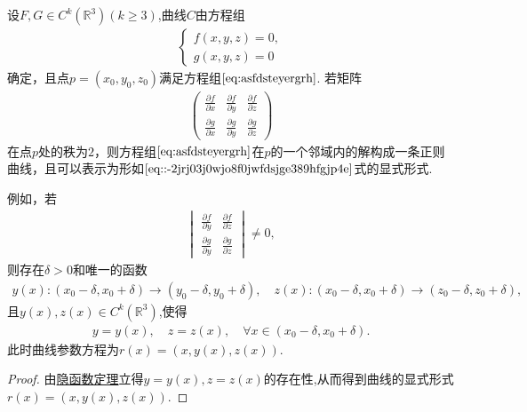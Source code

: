 \documentclass[../../main.tex]{subfiles}%
\begin{document}
\begin{theorem}[正则参数曲线的隐式形式]
设$F,G\in C^k(\mathbb{R}^3)(k\geqslant 3)$,曲线$C$由方程组
\begin{gather}\label{eq:asfdsteyergrh}
\begin{cases}
f(x,y,z)=0,\\
g(x,y,z)=0
\end{cases}
\end{gather}
确定，且点$p=(x_0,y_0,z_0)$满足方程组$\eqref{eq:asfdsteyergrh}$. 若矩阵
\begin{align*}
\begin{pmatrix}
\frac{\partial f}{\partial x} & \frac{\partial f}{\partial y} & \frac{\partial f}{\partial z}\\[2mm]
\frac{\partial g}{\partial x} & \frac{\partial g}{\partial y} & \frac{\partial g}{\partial z}
\end{pmatrix}
\end{align*}
在点$p$处的秩为$2$，则方程组$\eqref{eq:asfdsteyergrh}$在$p$的一个邻域内的解构成一条正则曲线，且可以表示为形如$\eqref{eq::-2jrj03j0wjo8f0jwfdsjge389hfgjp4e}$式的显式形式.

例如，若
\begin{align*}
\begin{vmatrix}
\frac{\partial f}{\partial y} & \frac{\partial f}{\partial z}\\[2mm]
\frac{\partial g}{\partial y} & \frac{\partial g}{\partial z}
\end{vmatrix}\neq 0,
\end{align*}
则存在$\delta>0$和唯一的函数
\begin{align*}
y(x):(x_0-\delta ,x_0+\delta )\rightarrow (y_0-\delta ,y_0+\delta ),
\quad z(x):(x_0-\delta ,x_0+\delta )\rightarrow (z_0-\delta ,z_0+\delta ),
\end{align*}
且$y(x),z(x)\in C^k(\mathbb{R}^3)$,使得
\begin{align*}
y=y(x),\quad z=z(x),\quad \forall x\in (x_0-\delta,x_0+\delta).
\end{align*}
此时曲线参数方程为$r(x)=(x,y(x),z(x))$. 
\end{theorem}
\begin{proof}

由\hyperref[Basis-of-Analytics-theorem:隐函数组定理多变量一般形式]{隐函数定理}立得$y=y(x),z=z(x)$的存在性,从而得到曲线的显式形式$r(x)=(x,y(x),z(x))$. 

\end{proof}
\end{document}
